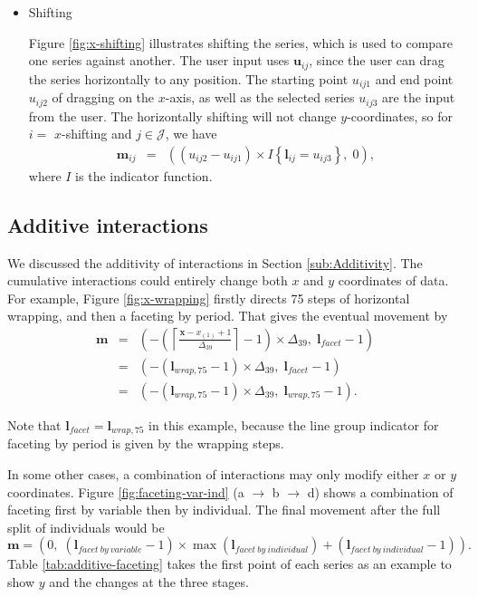 \documentclass[12pt]{article}
\begin{document}
\begin{itemize}
\item Shifting 

Figure \ref{fig:x-shifting} illustrates shifting the series, which is used to compare one series against another. The user input uses $\mathbf{u}{}_{ij}$, since the user can drag the
series horizontally to any position. The starting point
$u_{ij1}$ and end point $u_{ij2}$ of dragging on the $x$-axis,
as well as the selected series $u_{ij3}$ are the input from the user.
The horizontally shifting will not change $y$-coordinates, so for
$i=$ $x$-shifting and $j\in\mathcal{J}$, we have
\begin{eqnarray*}
\mathbf{m}{}_{ij} & = & 
((u_{ij2}-u_{ij1})\times I\left\{ \mathbf{l}{}_{ij}=u_{ij3}\right\}, \; 0),
\end{eqnarray*}
where $I$ is the indicator function.

\end{itemize}

\subsection{Additive interactions\label{interaction-addition}}

We discussed the additivity of interactions in Section
\ref{sub:Additivity}. The cumulative interactions could
entirely change both $x$ and $y$ coordinates of data.
For example, Figure \ref{fig:x-wrapping} firstly directs
75 steps of horizontal wrapping, and then a faceting by
period. That gives the eventual movement by
\begin{eqnarray*}
\mathbf{m} & = & (-\left(\left\lceil \frac{\mathbf{x}-x_{(1)}+1}{\Delta_{39}}\right\rceil -1\right)\times\Delta_{39}, \; \mathbf{l}{}_{facet}-1) \\
& = & (-(\mathbf{l}{}_{wrap,75} -1)\times\Delta_{39}, \; \mathbf{l}{}_{facet}-1) \\
& = & (-(\mathbf{l}{}_{wrap,75} -1)\times\Delta_{39}, \; \mathbf{l}{}_{wrap,75}-1).
\end{eqnarray*}

Note that $\mathbf{l}{}_{facet} = \mathbf{l}{}_{wrap,75}$
in this example, because the line group indicator for
faceting by period is given by the wrapping steps.

In some other cases, a combination of interactions may
only modify either $x$ or $y$ coordinates. Figure
\ref{fig:faceting-var-ind} (a $\rightarrow$ b $\rightarrow$ d)
shows a combination of faceting first by variable then
by individual. The final movement after the full split
of individuals would be
\[
\mathbf{m} = (0, \; (\mathbf{l}{}_{facet~by~variable}-1)\times \max(\mathbf{l}{}_{facet~by~individual})+(\mathbf{l}{}_{facet~by~individual}-1)).
\]
Table \ref{tab:additive-faceting} takes the first point
of each series as an example to show $y$ and the changes
at the three stages.
\end{document}
